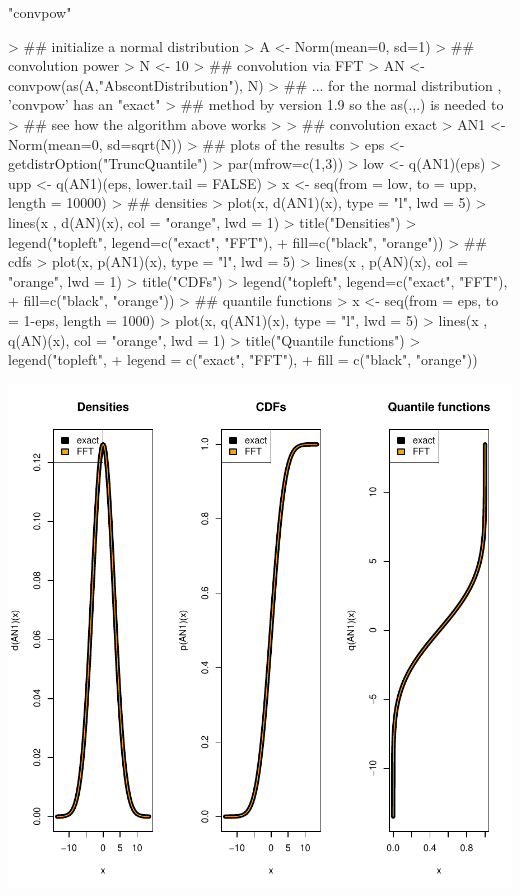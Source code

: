 \documentclass[11pt]{article}
\begin{document}
\begin{Schunk}
\begin{Soutput}
[1] "convpow"
\end{Soutput}
\begin{Sinput}
> ## initialize a normal distribution
> A <- Norm(mean=0, sd=1)
> ## convolution power
> N <- 10
> ## convolution via FFT
> AN <- convpow(as(A,"AbscontDistribution"), N)
> ##  ... for the normal distribution , 'convpow' has an "exact"
> ##      method by version 1.9 so the as(.,.)  is needed to
> ##      see how the algorithm above works
>
> ## convolution exact
> AN1 <- Norm(mean=0, sd=sqrt(N))
> ## plots of the results
> eps <- getdistrOption("TruncQuantile")
> par(mfrow=c(1,3))
> low <- q(AN1)(eps)
> upp <- q(AN1)(eps, lower.tail = FALSE)
> x <- seq(from = low, to = upp, length = 10000)
> ## densities
> plot(x, d(AN1)(x), type = "l", lwd = 5)
> lines(x , d(AN)(x), col = "orange", lwd = 1)
> title("Densities")
> legend("topleft", legend=c("exact", "FFT"),
+         fill=c("black", "orange"))
> ## cdfs
> plot(x, p(AN1)(x), type = "l", lwd = 5)
> lines(x , p(AN)(x), col = "orange", lwd = 1)
> title("CDFs")
> legend("topleft", legend=c("exact", "FFT"),
+         fill=c("black", "orange"))
> ## quantile functions
> x <- seq(from = eps, to = 1-eps, length = 1000)
> plot(x, q(AN1)(x), type = "l", lwd = 5)
> lines(x , q(AN)(x), col = "orange", lwd = 1)
> title("Quantile functions")
> legend("topleft",
+        legend = c("exact", "FFT"),
+         fill = c("black", "orange"))
\end{Sinput}
\end{Schunk}
\includegraphics{distr-nFoldConvolution}

\end{document}
\end{Sinput}
\end{Schunk}
\end{document}

